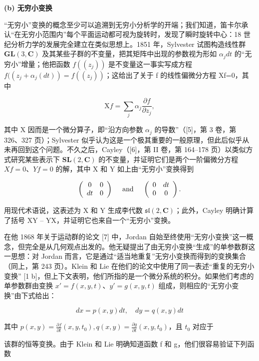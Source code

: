 \textbf{(b) 无穷小变换}

“无穷小”变换的概念至少可以追溯到无穷小分析学的开端；我们知道，笛卡尔承认“在无穷小范围内”每个平面运动都可视为旋转时，发现了瞬时旋转中心：18 世纪分析力学的发展完全建立在类似思想上。1851 年，Sylvester 试图构造线性群 \(\mathbf{GL}(3,\mathbf{C})\) 及其某些子群的不变量，把其矩阵中出现的参数视为形如 \(\alpha_{j}dt\) 的“无穷小”增量；他把函数 \(f((z_{j}))\) 是不变量这一事实写成方程 \(f((z_{j}+\alpha_{j}(dt))=f((z_{j}))\)；这给出了关于 f 的线性偏微分方程 Xf=0，其中

\[
\mathrm{X} f = \sum_ {j} \alpha_ {j} \frac {\partial f}{\partial z _ {j}},\tag{1}
\]

其中 X 因而是一个微分算子，即“沿方向参数 \(\alpha_{j}\) 的导数”（{[}5{]}，第 3 卷，第 326、327 页）；Sylvester 似乎认为这是一个极其重要的一般原理，但此后似乎从未再回到这个问题。不久之后，Cayley（{[}6{]}，第 II 卷，第 164--178 页）以类似方式研究某些表示下 \(\mathbf{SL}(2,\mathbf{C})\) 的不变量，并证明它们是两个一阶偏微分方程 \(Xf=0\)、\(Yf=0\) 的解，其中 X 和 Y 如上由“无穷小”变换得到

\[
\left( \begin{array}{c c} 0 & 0 \\ d t & 0 \end{array} \right) \quad \text { and } \quad \left( \begin{array}{c c} 0 & d t \\ 0 & 0 \end{array} \right).
\]

用现代术语说，这表述为 X 和 Y 生成李代数 \(\mathfrak{sl}(2,\mathbf{C})\)；此外，Cayley 明确计算了括号 XY -- YX，并证明它也来自一个“无穷小”变换。

在他 1868 年关于运动群的论文 {[}7{]} 中，Jordan 自始至终使用“无穷小变换”这一概念，但完全是从几何观点出发的。他无疑提出了由无穷小变换“生成”的单参数群这一思想：对 Jordan 而言，它是通过“适当地重复”无穷小变换而得到的变换集合（同上，第 243 页）。Klein 和 Lie 在他们的论文中使用了同一表述“重复的无穷小变换” {[}1 b{]}，但上下文表明，他们所指的是一个微分系统的积分。如果他们考虑的单参数群由变换 \(x' = f(x, y, t)\)、\(y' = g(x, y, t)\) 组成，则相应的“无穷小变换”由下式给出：

\[
d x = p (x, y) d t, \quad d y = q (x, y) d t
\]

其中 \(p(x,y) = \frac{\partial f}{\partial t} (x,y,t_0), q(x,y) = \frac{\partial g}{\partial t} (x,y,t_0)\)，且 \(t_0\) 对应于

该群的恒等变换。由于 Klein 和 Lie 明确知道函数 f 和 g，他们很容易验证下列函数


